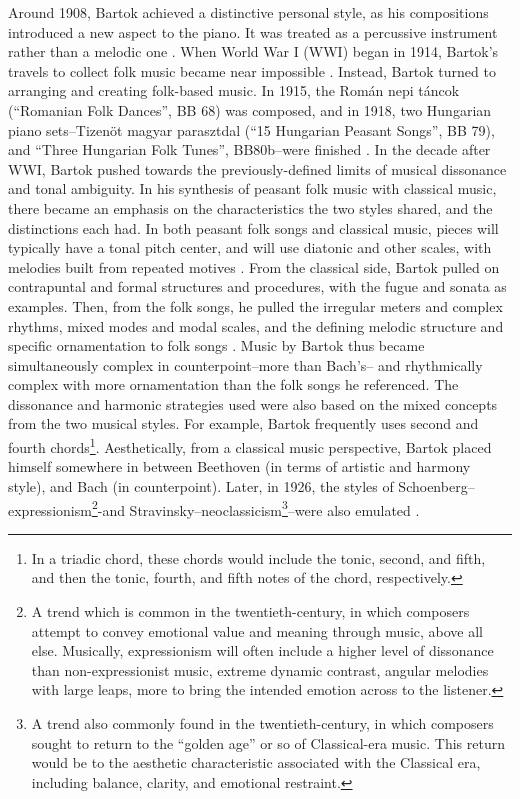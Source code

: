 Around 1908, Bartok achieved a distinctive personal style, as his compositions introduced a new aspect to the piano. It was treated as a percussive instrument rather than a melodic one \autocite{Burkholder_Grout_Palisca_2014}. When World War I (WWI) began in 1914, Bartok's travels to collect folk music became near impossible \autocite{Gillies}. Instead, Bartok turned to arranging and creating folk-based music. In 1915, the Román nepi táncok (``Romanian Folk Dances'', BB 68) was composed, and in 1918, two Hungarian piano sets--Tizenöt magyar parasztdal (``15 Hungarian Peasant Songs'', BB 79), and ``Three Hungarian Folk Tunes'', BB80b--were finished \autocite{Gillies}. In the decade after WWI, Bartok pushed towards the previously-defined limits of musical dissonance and tonal ambiguity. In his synthesis of peasant folk music with classical music, there became an emphasis on the characteristics the two styles shared, and the distinctions each had. In both peasant folk songs and classical music, pieces will typically have a tonal pitch center, and will use diatonic and other scales, with melodies built from repeated motives \autocite{Burkholder_Grout_Palisca_2014}. From the classical side, Bartok pulled on contrapuntal and formal structures and procedures, with the fugue and sonata as examples. Then, from the folk songs, he pulled the irregular meters and complex rhythms, mixed modes and modal scales, and the defining melodic structure and specific ornamentation to folk songs \autocite{Burkholder_Grout_Palisca_2014}. Music by Bartok thus became simultaneously complex in counterpoint--more than Bach's-- and rhythmically complex with more ornamentation than the folk songs he referenced. The dissonance and harmonic strategies used were also based on the mixed concepts from the two musical styles. For example, Bartok frequently uses second and fourth chords\footnote{In a triadic chord, these chords would include the tonic, second, and fifth, and then the tonic, fourth, and fifth notes of the chord, respectively.}. Aesthetically, from a classical music perspective, Bartok placed himself somewhere in between Beethoven (in terms of artistic and harmony style), and Bach (in counterpoint). Later, in 1926, the styles of Schoenberg--expressionism\footnote{A trend which is common in the twentieth-century, in which composers attempt to convey emotional value and meaning through music, above all else. Musically, expressionism will often include a higher level of dissonance than non-expressionist music, extreme dynamic contrast, angular melodies with large leaps, more to bring the intended emotion across to the listener.}-and Stravinsky--neoclassicism\footnote{A trend also commonly found in the twentieth-century, in which composers sought to return to the ``golden age'' or so of Classical-era music. This return would be to the aesthetic characteristic associated with the Classical era, including balance, clarity, and emotional restraint.}--were also emulated \autocite{Gillies}.

